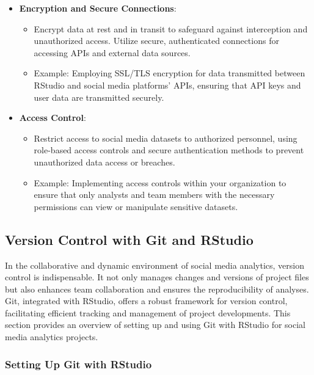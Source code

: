 \documentclass[
]{book}
\providecommand{\tightlist}{%
  \setlength{\itemsep}{0pt}\setlength{\parskip}{0pt}}
\begin{document}
\begin{itemize}
\tightlist
\item
  \textbf{Encryption and Secure Connections}:

  \begin{itemize}
  \tightlist
  \item
    Encrypt data at rest and in transit to safeguard against interception and unauthorized access. Utilize secure, authenticated connections for accessing APIs and external data sources.
  \item
    Example: Employing SSL/TLS encryption for data transmitted between RStudio and social media platforms' APIs, ensuring that API keys and user data are transmitted securely.
  \end{itemize}
\item
  \textbf{Access Control}:

  \begin{itemize}
  \tightlist
  \item
    Restrict access to social media datasets to authorized personnel, using role-based access controls and secure authentication methods to prevent unauthorized data access or breaches.
  \item
    Example: Implementing access controls within your organization to ensure that only analysts and team members with the necessary permissions can view or manipulate sensitive datasets.
  \end{itemize}
\end{itemize}

\hypertarget{version-control-with-git-and-rstudio}{%
\subsection{Version Control with Git and RStudio}\label{version-control-with-git-and-rstudio}}

In the collaborative and dynamic environment of social media analytics, version control is indispensable. It not only manages changes and versions of project files but also enhances team collaboration and ensures the reproducibility of analyses. Git, integrated with RStudio, offers a robust framework for version control, facilitating efficient tracking and management of project developments. This section provides an overview of setting up and using Git with RStudio for social media analytics projects.

\hypertarget{setting-up-git-with-rstudio}{%
\subsubsection{Setting Up Git with RStudio}\label{setting-up-git-with-rstudio}}
\end{document}
